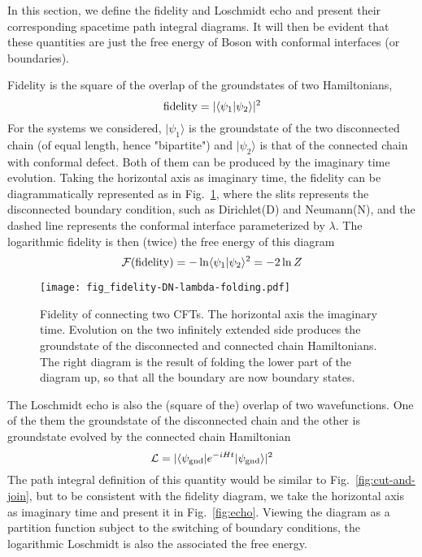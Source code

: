
In this section, we define the fidelity and Loschmidt echo and present their corresponding spacetime path integral diagrams. It will then be evident that these quantities are just the free energy of Boson with conformal interfaces (or boundaries). 

Fidelity is the square of the overlap of the groundstates of two Hamiltonians, 
\begin{equation}
{\rm fidelity} = |\langle \psi_1 |\psi_2  \rangle |^2 
\end{equation}
For the systems we considered, $|\psi_1 \rangle$ is the groundstate of the two disconnected chain (of equal length, hence "bipartite") and $|\psi_2\rangle$ is that of the connected chain with conformal defect. Both of them can be produced by the imaginary time evolution. Taking the horizontal axis as imaginary time, the fidelity can be diagrammatically represented as in Fig.~\ref{fig:fidel}, where the slits represents the disconnected boundary condition, such as Dirichlet(D) and Neumann(N), and the dashed line represents the conformal interface parameterized by $\lambda$. The logarithmic fidelity is then (twice) the free energy of this diagram
\begin{equation}
\mathcal{F}( {\rm fidelity} )  = - \ln \langle \psi_1 |\psi_2 \rangle^2 = - 2 \ln Z
\end{equation}

\begin{figure}[h]
\texttt{[image: fig\_fidelity-DN-lambda-folding.pdf]}
\caption{Fidelity of connecting two CFTs. The horizontal axis the imaginary time. Evolution on the two infinitely extended side produces the groundstate of the disconnected and connected chain Hamiltonians. The right diagram is the result of folding the lower part of the diagram up, so that all the boundary are now boundary states.}
\label{fig:fidel}
\end{figure}

The Loschmidt echo is also the (square of the) overlap of two wavefunctions. One of the them the groundstate of the disconnected chain and the other is groundstate evolved by the connected chain Hamiltonian
\begin{equation}
\mathcal{L} = |\langle \psi_{\rm gnd}  | e^{-i H t } | \psi_{\rm gnd} \rangle|^2
\end{equation}
The path integral definition of this quantity would be similar to Fig.~\ref{fig:cut-and-join}, but to be consistent with the fidelity diagram, we take the horizontal axis as imaginary time and present it in Fig.~\ref{fig:echo}. Viewing the diagram as a partition function subject to the switching of boundary conditions, the logarithmic Loschmidt is also the associated the free energy.


